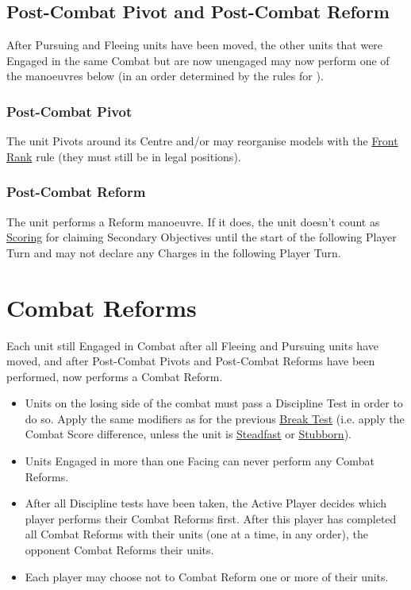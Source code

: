 \subsection{Post-Combat Pivot and Post-Combat Reform}
\label{post_combat_pivot_and_post_combat_reform}

After Pursuing and Fleeing units have been moved, the other units that were Engaged in the same Combat but are now unengaged may now perform one of the manoeuvres below (in an order determined by the rules for ).

\subsubsection{Post-Combat Pivot}
\label{post_combat_pivot}

The unit Pivots around its Centre and/or may reorganise models with the \hyperref[front_rank]{Front Rank} rule (they must still be in legal positions).

\subsubsection{Post-Combat Reform}
\label{post_combat_reform}

The unit performs a Reform manoeuvre. If it does, the unit doesn't count as \hyperref[scoring]{Scoring} for claiming Secondary Objectives until the start of the following Player Turn and may not declare any Charges in the following Player Turn.

\clearpage
\section{Combat Reforms}
\label{combat_reform}

Each unit still Engaged in Combat after all Fleeing and Pursuing units have moved, and after Post-Combat Pivots and Post-Combat Reforms have been performed, now performs a Combat Reform.

\begin{itemize}
\item Units on the losing side of the combat must pass a Discipline Test in order to do so. Apply the same modifiers as for the previous \hyperref[break_test]{Break Test} (i.e. apply the Combat Score difference, unless the unit is \hyperref[steadfast]{Steadfast} or \hyperref[stubborn]{Stubborn}).
\item Units Engaged in more than one Facing can never perform any Combat Reforms.
\item After all Discipline tests have been taken, the Active Player decides which player performs their Combat Reforms first. After this player has completed all Combat Reforms with their units (one at a time, in any order), the opponent Combat Reforms their units.
\item Each player may choose not to Combat Reform one or more of their units.
\end{itemize}

